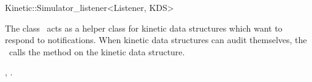 

\begin{ccRefClass}{Kinetic::Simulator_listener<Listener, KDS>}  %


\ccDefinition
  
The class \ccRefName\ acts as a helper class for kinetic data
structures which want to respond to
 notifications. When kinetic
data structures can audit themselves, the \ccRefName\ calls the
 method on the kinetic data structure.



\ccCreation
{}  %


\ccSeeAlso

, .



\end{ccRefClass}


